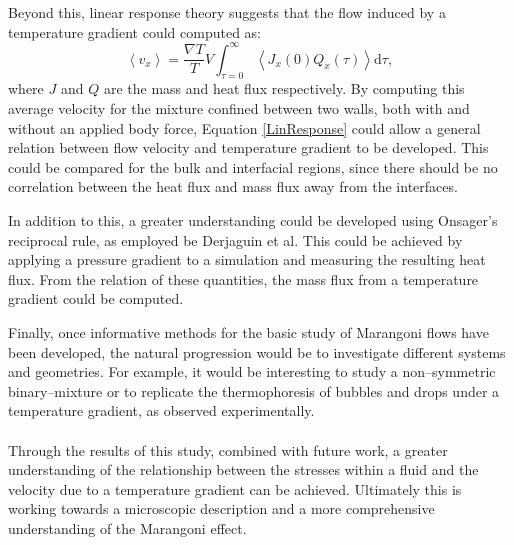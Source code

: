 Beyond this, linear response theory suggests that the flow induced by a temperature gradient could computed as:
\begin{equation}
\left< v_{x} \right> = \frac{\nabla T}{T} V \int_{\tau =0}^{\infty} \left< J_{x}(0) Q_{x}(\tau) \right> \mathrm{d} \tau,
\label{LinResponse}
\end{equation}
where $J$ and $Q$ are the mass and heat flux respectively.
By computing this average velocity for the mixture confined between two walls, both with and without an applied body force, Equation \ref{LinResponse} could allow a general relation between flow velocity and temperature gradient to be developed.
This could be compared for the bulk and interfacial regions, since there should be no correlation between the heat flux and mass flux away from the interfaces.

In addition to this, a greater understanding could be developed using Onsager's reciprocal rule, as employed be Derjaguin et al.
This could be achieved by applying a pressure gradient to a simulation and measuring the resulting heat flux.
From the relation of these quantities, the mass flux from a temperature gradient could be computed. 

Finally, once informative methods for the basic study of Marangoni flows have been developed, the natural progression would be to investigate different systems and geometries.
For example, it would be interesting to study a non--symmetric binary--mixture or to replicate the thermophoresis of bubbles and drops under a temperature gradient, as observed experimentally.
\\
\\
\indent Through the results of this study, combined with future work, a greater understanding of the relationship between the stresses within a fluid and the velocity due to a temperature gradient can be achieved. 
Ultimately this is working towards a microscopic description and a more comprehensive understanding of the Marangoni effect.
